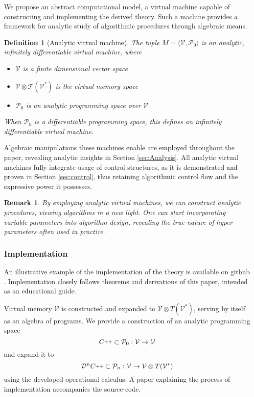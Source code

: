 \documentclass[preprint,12pt]{elsarticle}
\newcommand{\T}{\mathcal{T}}
\newcommand{\VV}{\mathcal{V}}
\newcommand{\CC}{C\nolinebreak\hspace{-.05em}\raisebox{.4ex}{\tiny\bf +}\nolinebreak\hspace{-.10em}\raisebox{.4ex}{\tiny\bf +}}
\def\CC{{C\nolinebreak[4]\hspace{-.05em}\raisebox{.4ex}{\tiny\bf ++}}}
\newcommand{\dP}{\mathcal{P}}
\newcommand{\DD}{\mathcal{D}}
\newtheorem{definicija}{Definition}[section]
\newtheorem{opomba}{Remark}[section]
\begin{document}
We propose an abstract computational model, a virtual machine capable of constructing and implementing the derived theory. Such a machine provides a framework for analytic study of algorithmic procedures through algebraic means.

\begin{definicija}[Analytic virtual machine]\label{def:analyticMachine}
The tuple $M=\langle \VV,\dP_0\rangle$ is an analytic, infinitely  differentiable virtual machine, where
   
    \begin{itemize}
    \item
    $\VV$ is a finite dimensional vector space
    \item
    $\VV\otimes \T(\VV^*)$ is the virtual memory space
    \item
    $\dP_0$ is an analytic programming space over $\VV$
    \end{itemize}
    When $\dP_0$ is a differentiable programming space, this defines an
    infinitely differentiable virtual machine.
  \end{definicija}
Algebraic manipulations these machines enable are employed throughout the paper, revealing analytic insights in Section \ref{sec:Analysis}.  All analytic virtual machines fully integrate usage of control structures, as it is demonstrated and proven in Section \ref{sec:control}, thus retaining algorithmic control flow and the expressive power it possesses.
\begin{opomba}
By employing analytic virtual machines, we can construct analytic procedures, viewing algorithms in a new light. One can start incorporating variable parameters into algorithm design, revealing the true nature of hyper-parameters often used in practice.

\end{opomba}
\subsubsection{Implementation}

An illustrative example of the implementation of the theory is available on github \cite{dC++}. Implementation closely follows theorems and derivations of this paper, intended as an educational guide.

Virtual memory $\VV$ is constructed and expanded to $\VV\otimes T(\VV^*)$, serving by itself as an algebra of programs. We provide a construction of an analytic programming space
\begin{equation}
\CC\subset \dP_0:\VV\to\VV
\end{equation}
and expand it to
\begin{equation}
\DD^n\CC\subset\dP_n:\VV\to\VV\otimes T(\VV^*)
\end{equation}
using the developed operational calculus. A paper \cite{dC++Paper} explaining the process of implementation accompanies the source-code. 
\end{document}
